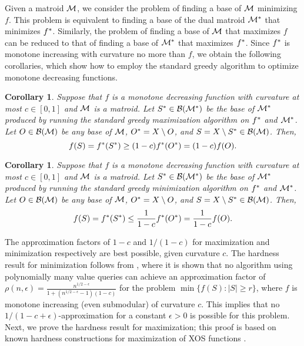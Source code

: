 \documentclass{article}
\newtheorem{corollary}[theorem]{Corollary}
\theoremstyle{definition}
\begin{document}
Given a matroid $\mathcal{M}$, we consider the problem of finding a base of $\mathcal{M}$ minimizing $f$.  This problem is equivalent to finding a base of the dual matroid $\mathcal{M}^{*}$ that minimizes $f^{*}$.  Similarly, the problem of finding a base of $\mathcal{M}$ that maximizes $f$ can be reduced to that of finding a base of $\mathcal{M}^{*}$ that maximizes $f^{*}$.  Since $f^{*}$ is monotone increasing with curvature no more than $f$, we obtain the following corollaries, which show how to employ the standard greedy algorithm to optimize monotone decreasing functions.
\begin{corollary}
\label{thm:arbitrary-max-decreasing}
Suppose that $f$ is a monotone decreasing function with curvature at most $c \in [0,1]$ and $\mathcal{M}$ is a matroid.  Let $S^{*} \in \mathcal{B}(\mathcal{M}^{*})$ be the base of $\mathcal{M}^{*}$ produced by running the standard greedy maximization algorithm on $f^{*}$ and $\mathcal{M}^{*}$.  Let $O \in \mathcal{B}(\mathcal{M})$ be any base of $\mathcal{M}$, $O^{*} = X \setminus O$, and $S = X \setminus S^{*} \in \mathcal{B}(\mathcal{M})$.  Then,
\[
f(S) = f^{*}(S^{*}) \ge (1-c)f^{*}(O^{*}) = (1-c)f(O).
\]
\end{corollary}
\begin{corollary}
\label{thm:arbitrary-min-decreasing}
Suppose that $f$ is a monotone decreasing function with curvature at most $c \in [0,1]$ and $\mathcal{M}$ is a matroid.  Let $S^{*} \in \mathcal{B}(\mathcal{M}^{*})$ be the base of $\mathcal{M}^{*}$ produced by running the standard greedy minimization algorithm on $f^{*}$ and $\mathcal{M}^{*}$.  Let $O \in \mathcal{B}(\mathcal{M})$ be any base of $\mathcal{M}$, $O^{*} = X \setminus O$, and $S = X \setminus S^{*} \in \mathcal{B}(\mathcal{M})$.  Then,
\[
f(S) = f^{*}(S^{*}) \le \frac{1}{1-c}f^{*}(O^{*}) = \frac{1}{1-c}f(O).
\]
\end{corollary}

The approximation factors of $1-c$ and $1/(1-c)$ for maximization and minimization respectively are best possible, given curvature $c$.
The hardness result for minimization follows from \cite{IJB}, where it is shown that no algorithm using polynomially many value queries can achieve an approximation factor of $\rho(n,\epsilon) = \frac{n^{1/2 - \epsilon}}{1 + (n^{1/2 - \epsilon} - 1)(1 - c)}$ for the problem $\min \{ f(S): |S| \ge r \}$, where $f$ is monotone increasing (even submodular) of curvature $c$. This implies that no $1/(1-c+\epsilon)$-approximation for a constant $\epsilon>0$ is possible for this problem. Next, we prove the hardness result for maximization; this proof is based on known hardness constructions for maximization of XOS functions \cite{DobzinskiS06,MirrokniSV08}.
\end{document}
